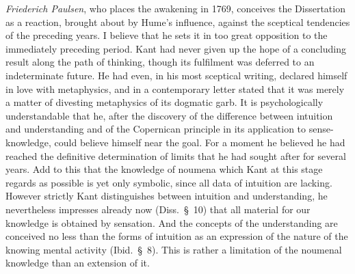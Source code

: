 \documentclass[12pt,a4paper]{article}
\newcommand{\opage}[1]{\marginnote{\footnotesize\textit{[#1]}}}
\begin{document}
\emph{Friederich Paulsen}, who places the awakening in 1769, conceives the
Dissertation as a reaction, brought about by Hume's influence, against the
sceptical tendencies of the preceding years. I believe that he sets it in
too great opposition to the immediately preceding period. Kant had never
given up the hope of a concluding result along the path of thinking, though
its fulfilment was deferred to an indeterminate future. He had even, in his
most sceptical writing, declared himself in love with metaphysics, and in a
contemporary letter stated that it was merely a matter of divesting
metaphysics of its dogmatic garb. It is psychologically understandable that
he, after the discovery of the difference between intuition and understanding
and of the Copernican principle in its application to sense-knowledge, could
believe himself near the goal. For a moment he believed he had reached the
definitive determination of limits that he had sought after for several
years. Add to this that the knowledge of noumena which Kant at this stage
regards as possible is yet only symbolic, since all data of intuition are
lacking. However strictly Kant distinguishes between intuition and
understanding, he nevertheless impresses already now (Diss.\ §\ 10) that all
material for our knowledge is obtained by sensation. And the concepts of the
understanding are \opage{51}conceived no less than the forms of intuition as an
expression of the nature of the knowing mental activity (Ibid.\ §\ 8). This
is rather a limitation of the noumenal knowledge than an extension of it.
\end{document}

